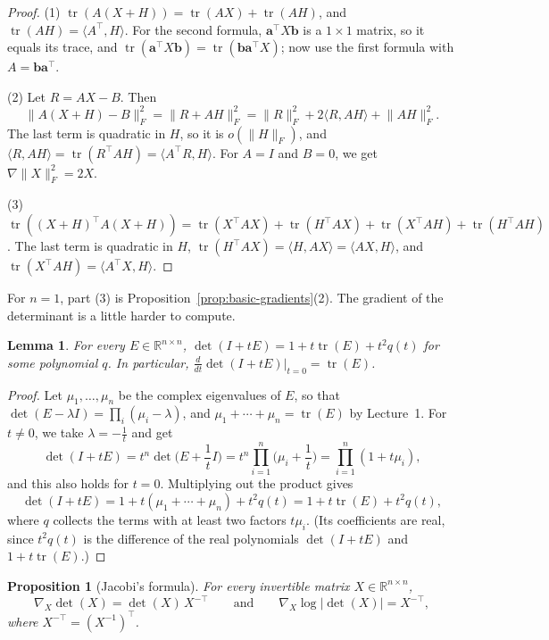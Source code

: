 \documentclass[11pt]{article}
\newcommand{\norm}[1]{\lVert #1 \rVert}
\newcommand{\ip}[2]{\langle #1, #2 \rangle}
\theoremstyle{definition}
\theoremstyle{plain}
\newtheorem{proposition}[definition]{Proposition}
\newtheorem{lemma}[definition]{Lemma}
\theoremstyle{remark}
\DeclareMathOperator{\tr}{tr}
\begin{document}
\begin{proof}
    (1) $\tr(A(X + H)) = \tr(AX) + \tr(AH)$, and $\tr(AH) = \ip{A^\top}{H}$. For the second formula, $\mathbf{a}^\top X \mathbf{b}$ is a $1 \times 1$ matrix, so it equals its trace, and $\tr(\mathbf{a}^\top X \mathbf{b}) = \tr(\mathbf{b}\mathbf{a}^\top X)$; now use the first formula with $A = \mathbf{b}\mathbf{a}^\top$.

    (2) Let $R = AX - B$. Then
    \[\norm{A(X + H) - B}_F^2 = \norm{R + AH}_F^2 = \norm{R}_F^2 + 2\ip{R}{AH} + \norm{AH}_F^2.\]
    The last term is quadratic in $H$, so it is $o(\norm{H}_F)$, and $\ip{R}{AH} = \tr(R^\top A H) = \ip{A^\top R}{H}$. For $A = I$ and $B = 0$, we get $\nabla \norm{X}_F^2 = 2X$.

    (3) $\tr((X + H)^\top A (X + H)) = \tr(X^\top A X) + \tr(H^\top A X) + \tr(X^\top A H) + \tr(H^\top A H)$. The last term is quadratic in $H$, $\tr(H^\top A X) = \ip{H}{AX} = \ip{AX}{H}$, and $\tr(X^\top A H) = \ip{A^\top X}{H}$.
\end{proof}

For $n = 1$, part (3) is Proposition~\ref{prop:basic-gradients}(2). The gradient of the determinant is a little harder to compute.

\begin{lemma}\label{lem:det-identity}
    For every $E \in \mathbb{R}^{n \times n}$, $\det(I + tE) = 1 + t\tr(E) + t^2 q(t)$ for some polynomial $q$. In particular, $\frac{d}{dt}\det(I + tE)\big|_{t = 0} = \tr(E)$.
\end{lemma}

\begin{proof}
    Let $\mu_1, \ldots, \mu_n$ be the complex eigenvalues of $E$, so that $\det(E - \lambda I) = \prod_i (\mu_i - \lambda)$, and $\mu_1 + \cdots + \mu_n = \tr(E)$ by Lecture~1. For $t \neq 0$, we take $\lambda = -\frac{1}{t}$ and get
    \[\det(I + tE) = t^n \det\Big(E + \frac{1}{t} I\Big) = t^n \prod_{i=1}^n \Big(\mu_i + \frac{1}{t}\Big) = \prod_{i=1}^n (1 + t\mu_i),\]
    and this also holds for $t = 0$. Multiplying out the product gives
    \[\det(I + tE) = 1 + t(\mu_1 + \cdots + \mu_n) + t^2 q(t) = 1 + t\tr(E) + t^2 q(t),\]
    where $q$ collects the terms with at least two factors $t\mu_i$. (Its coefficients are real, since $t^2 q(t)$ is the difference of the real polynomials $\det(I + tE)$ and $1 + t\tr(E)$.)
\end{proof}

\begin{proposition}[Jacobi's formula]\label{prop:det-gradient}
    For every invertible matrix $X \in \mathbb{R}^{n \times n}$,
    \[\nabla_X \det(X) = \det(X) \, X^{-\top} \qquad \text{and} \qquad \nabla_X \log|\det(X)| = X^{-\top},\]
    where $X^{-\top} = (X^{-1})^\top$.
\end{proposition}
\end{document}
